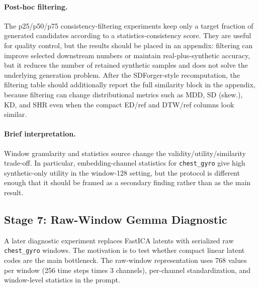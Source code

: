 \paragraph{Post-hoc filtering.}
The p25/p50/p75 consistency-filtering experiments keep only a target fraction of
generated candidates according to a statistics-consistency score. They are useful
for quality control, but the results should be placed in an appendix: filtering
can improve selected downstream numbers or maintain real-plus-synthetic accuracy,
but it reduces the number of retained synthetic samples and does not solve the
underlying generation problem. After the SDForger-style recomputation, the
filtering table should additionally report the full similarity block in the
appendix, because filtering can change distributional metrics such as MDD, SD
(skew.), KD, and SHR even when the compact ED/ref and DTW/ref columns look
similar.

\paragraph{Brief interpretation.}
Window granularity and statistics source change the validity/utility/similarity
trade-off. In particular, embedding-channel statistics for \texttt{chest\_gyro}
give high synthetic-only utility in the window-128 setting, but the protocol is
different enough that it should be framed as a secondary finding rather than as
the main result.

\subsection*{Stage 7: Raw-Window Gemma Diagnostic}

A later diagnostic experiment replaces FastICA latents with serialized raw
\texttt{chest\_gyro} windows. The motivation is to test whether compact linear
latent codes are the main bottleneck. The raw-window representation uses 768
values per window (256 time steps times 3 channels), per-channel standardization,
and window-level statistics in the prompt.

\begin{table}[t]
\centering
\small
\caption{Raw-window Gemma diagnostic probes. These runs are not main results
because they currently lack complete similarity/utility evaluation and show
class-coverage issues.}
\label{tab:shanjun-raw}
\end{table}

